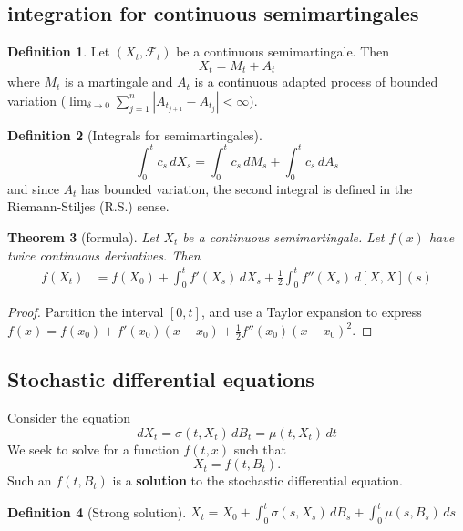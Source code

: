 \documentclass[10pt, oneside, reqno]{amsart}
\theoremstyle{plain}%
\newtheorem{thm}{Theorem}[section]
\theoremstyle{definition}
\newtheorem{defn}[thm]{Definition}
\theoremstyle{remark}
\newcommand{\sigf}{\mathcal{F}}
\begin{document}
\subsection{\itos integration for continuous semimartingales} %
\label{sub:itos_integration_for_continuous_semimartingales}
\begin{defn}
    Let $(X_t, \sigf_t)$ be a continuous semimartingale.  Then \[
        X_t = M_t + A_t 
    \] where $M_t$ is a martingale and $A_t$ is a continuous adapted process of bounded variation ($\lim_{\delta \rightarrow 0} \sum_{j=1}^n |A_{t_{j+1}} - A_{t_j} |< \infty$). 
\end{defn}

\begin{defn}[Integrals for semimartingales]
    \[
        \int_0^t c_s \, dX_s = \int_0^t c_s \, dM_s + \int_0^t c_s \, dA_s  
\] and since $A_t$ has bounded variation, the second integral is defined in the Riemann-Stiljes (R.S.) sense.
\end{defn}  

\begin{thm}[\itos formula]
    Let $X_t$ be a continuous semimartingale.  Let $f(x)$ have twice continuous derivatives.  Then \begin{align*}
        f(X_t) &= f(X_0) + \int_0^t f'(X_s) \, dX_s + \frac{1}{2} \int_0^t f''(X_s) \, d[X, X](s)
    \end{align*}
\end{thm}
\begin{proof}
    Partition the interval $[0,t]$, and use a Taylor expansion to express $f(x) = f(x_0) + f'(x_0)(x- x_0) + \frac{1}{2}f''(x_0)(x-x_0)^2$.
\end{proof}  

\subsection{Stochastic differential equations} %
\label{sub:stochastic_differential_equations}
Consider the equation \[
    dX_t = \sigma(t, X_t) \, dB_t = \mu(t, X_t) \, dt
\]  We seek to solve for a function $f(t, x)$ such that \[
    X_t = f(t, B_t).
\]  Such an $f(t, B_t)$ is a \textbf{solution} to the stochastic differential equation.
 
\begin{defn}[Strong solution]
    $X_t = X_0 + \int_0^t \sigma(s, X_s) \, dB_s + \int_0^t \mu(s, B_s) \, ds$
\end{defn}
\end{document}
